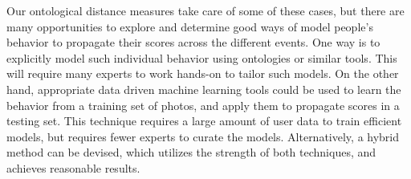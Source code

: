 Our ontological distance measures take care of some of these cases, but there are many opportunities to explore and determine good ways of model people's behavior to propagate their scores across the different events. One way is to explicitly model such individual behavior using ontologies or similar tools. This will require many experts to work hands-on to tailor such models. On the other hand, appropriate data driven machine learning tools could be used to learn the behavior from a training set of photos, and apply them to propagate scores in a testing set. This technique requires a large amount of user data to train efficient models, but requires fewer experts to curate the models. Alternatively, a hybrid method can be devised, which utilizes the strength of both techniques, and achieves reasonable results.